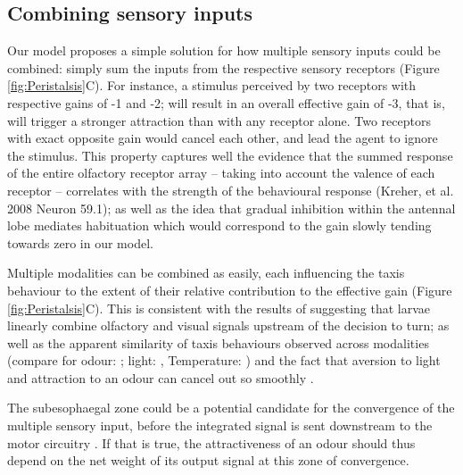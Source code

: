 \documentclass[11pt,a4paper]{article}
\begin{document}
\subsection{Combining sensory inputs}
Our model proposes a simple solution for how multiple sensory inputs could be combined: simply sum the inputs from the respective sensory receptors (Figure \ref{fig:Peristalsis}C). For instance, a stimulus perceived by two receptors with respective gains of -1 and -2; will result in an overall effective gain of -3, that is, will trigger a stronger attraction than with any receptor alone. Two receptors with exact opposite gain would cancel each other, and lead the agent to ignore the stimulus. This property captures well the evidence that the summed response of the entire olfactory receptor array – taking into account the valence of each receptor – correlates with the strength of the behavioural response (Kreher, et al. 2008 Neuron 59.1); as well as the idea that gradual inhibition within the antennal lobe mediates habituation \citep{das2011plasticity} which would correspond to the gain slowly tending towards zero in our model. 

Multiple modalities can be combined as easily, each influencing the taxis behaviour to the extent of their relative contribution to the effective gain (Figure \ref{fig:Peristalsis}C). This is consistent with the results of \cite{gepner2015computations} suggesting that larvae linearly combine olfactory and visual signals upstream of the decision to turn; as well as the apparent similarity of taxis behaviours observed across modalities (compare for odour: \citep{gomez2011active}; light: \cite{kane2013sensorimotor},   Temperature: \cite{lahiri2011two}) and the fact that aversion to light and attraction to an odour can cancel out so smoothly \cite{bellmann2010optogenetically}. 

The subesophaegal zone could be a potential candidate for the convergence of the multiple sensory input, before the integrated signal is sent downstream to the motor circuitry \cite{tastekin2015role}. If that is true, the attractiveness of an odour should thus depend on the net weight of its output signal at this zone of convergence.  
\end{document}
